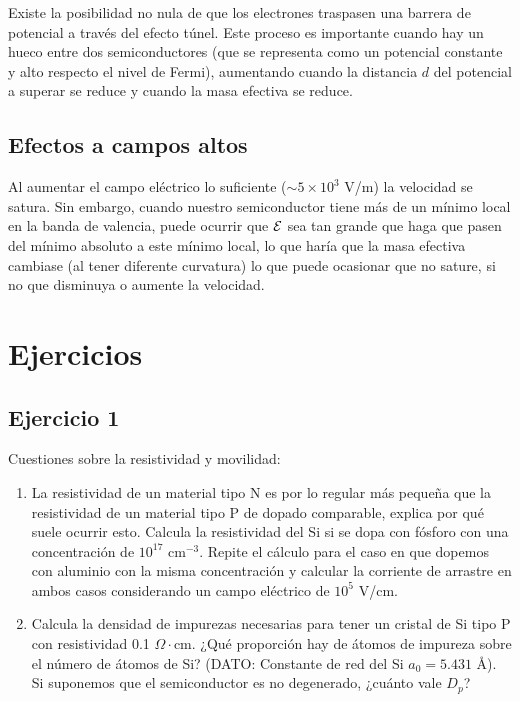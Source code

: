 Existe la posibilidad no nula de que los electrones traspasen una barrera de potencial a través del efecto túnel. Este proceso es importante cuando hay un hueco entre dos semiconductores (que se representa como un potencial constante y alto respecto el nivel de Fermi), aumentando cuando la distancia $d$ del potencial a superar se reduce y cuando la masa efectiva se reduce. 


\subsection{Efectos a campos altos}

Al aumentar el campo eléctrico lo suficiente ($\sim 5 \times 10^3$ V/m) la velocidad se satura. Sin embargo, cuando nuestro semiconductor tiene más de un mínimo local en la banda de valencia, puede ocurrir que $\mathcal{E}$ sea tan grande que haga que pasen del mínimo absoluto a este mínimo local, lo que haría que la masa efectiva cambiase (al tener diferente curvatura) lo que puede ocasionar que no sature, si no que disminuya o aumente la velocidad.



\newpage




\section{Ejercicios}

\subsection{Ejercicio 1}

Cuestiones sobre la resistividad y movilidad:
\begin{enumerate}[label=\alph*)]
	\item La resistividad de un material tipo N es por lo regular más pequeña que la resistividad de un material tipo P de dopado comparable, explica por qué suele ocurrir esto. Calcula la resistividad del Si si se dopa con fósforo con una concentración de \( 10^{17} \) cm\(^{-3}\). Repite el cálculo para el caso en que dopemos con aluminio con la misma concentración y calcular la corriente de arrastre en ambos casos considerando un campo eléctrico de \( 10^5 \) V/cm.

	\item Calcula la densidad de impurezas necesarias para tener un cristal de Si tipo P con resistividad 0.1 \(\Omega\cdot\)cm. ¿Qué proporción hay de átomos de impureza sobre el número de átomos de Si?
		  (DATO: Constante de red del Si \( a_0 = 5.431 \) Å). Si suponemos que el semiconductor es no degenerado, ¿cuánto vale \( D_p \)?
\end{enumerate}


